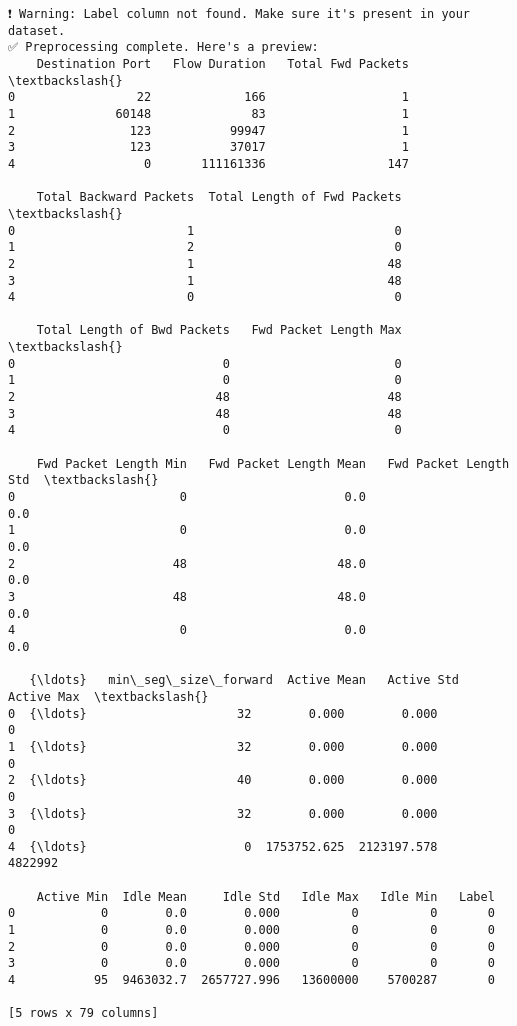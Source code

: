 \documentclass[11pt]{article}
\begin{document}
    \begin{Verbatim}[commandchars=\\\{\}]
❗ Warning: Label column not found. Make sure it's present in your dataset.
✅ Preprocessing complete. Here's a preview:
    Destination Port   Flow Duration   Total Fwd Packets  \textbackslash{}
0                 22             166                   1
1              60148              83                   1
2                123           99947                   1
3                123           37017                   1
4                  0       111161336                 147

    Total Backward Packets  Total Length of Fwd Packets  \textbackslash{}
0                        1                            0
1                        2                            0
2                        1                           48
3                        1                           48
4                        0                            0

    Total Length of Bwd Packets   Fwd Packet Length Max  \textbackslash{}
0                             0                       0
1                             0                       0
2                            48                      48
3                            48                      48
4                             0                       0

    Fwd Packet Length Min   Fwd Packet Length Mean   Fwd Packet Length Std  \textbackslash{}
0                       0                      0.0                     0.0
1                       0                      0.0                     0.0
2                      48                     48.0                     0.0
3                      48                     48.0                     0.0
4                       0                      0.0                     0.0

   {\ldots}   min\_seg\_size\_forward  Active Mean   Active Std   Active Max  \textbackslash{}
0  {\ldots}                     32        0.000        0.000            0
1  {\ldots}                     32        0.000        0.000            0
2  {\ldots}                     40        0.000        0.000            0
3  {\ldots}                     32        0.000        0.000            0
4  {\ldots}                      0  1753752.625  2123197.578      4822992

    Active Min  Idle Mean     Idle Std   Idle Max   Idle Min   Label
0            0        0.0        0.000          0          0       0
1            0        0.0        0.000          0          0       0
2            0        0.0        0.000          0          0       0
3            0        0.0        0.000          0          0       0
4           95  9463032.7  2657727.996   13600000    5700287       0

[5 rows x 79 columns]
    \end{Verbatim}
\end{document}
